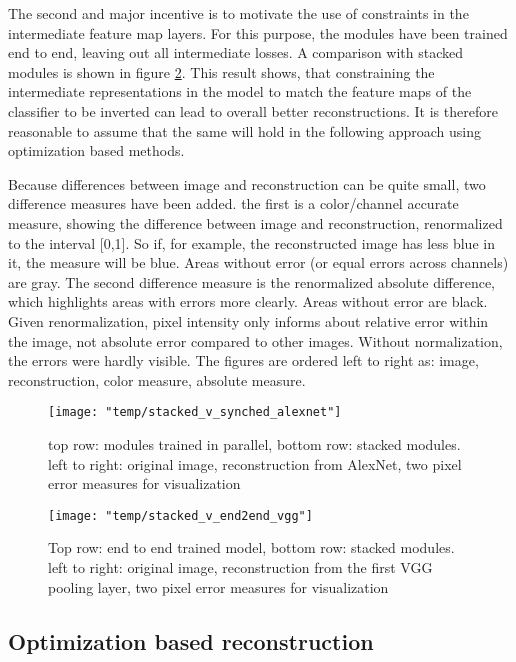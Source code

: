 \documentclass{article}
\begin{document}
The second and major incentive is to motivate the use of constraints in the intermediate feature map layers. For this purpose, the modules have been trained end to end, leaving out all intermediate losses. A comparison with stacked modules is shown in figure \ref{fig:stack_v_end2end}. This result shows, that constraining the intermediate representations in the model to match the feature maps of the classifier to be inverted can lead to overall better reconstructions. It is therefore reasonable to assume that the same will hold in the following approach using optimization based methods.

Because differences between image and reconstruction can be quite small, two difference measures have been added. the first is a color/channel accurate measure, showing the difference between image and reconstruction, renormalized to the interval [0,1]. So if, for example, the reconstructed image has less blue in it, the measure will be blue. Areas without error (or equal errors across channels) are gray. The second difference measure is the renormalized absolute difference, which highlights areas with errors more clearly. Areas without error are black. Given renormalization,  pixel intensity only informs about relative error within the image, not absolute error compared to other images. Without normalization, the errors were hardly visible. The figures are ordered left to right as: image, reconstruction, color measure, absolute measure. 

\begin{figure}
	\centering
	\texttt{[image: "temp/stacked\_v\_synched\_alexnet"]}
	\caption{top row: modules trained in parallel, bottom row: stacked modules.
		left to right: original image, reconstruction from AlexNet, two pixel error measures for visualization}
	\label{fig:stack_v_sync}
\end{figure}

\begin{figure}
	\centering
	\texttt{[image: "temp/stacked\_v\_end2end\_vgg"]}
	\caption{Top row: end to end trained model, bottom row: stacked modules. 
		left to right: original image, reconstruction from the first VGG pooling layer, two pixel error measures for visualization}
	\label{fig:stack_v_end2end}
\end{figure}

\subsection{Optimization based reconstruction}
\end{document}
